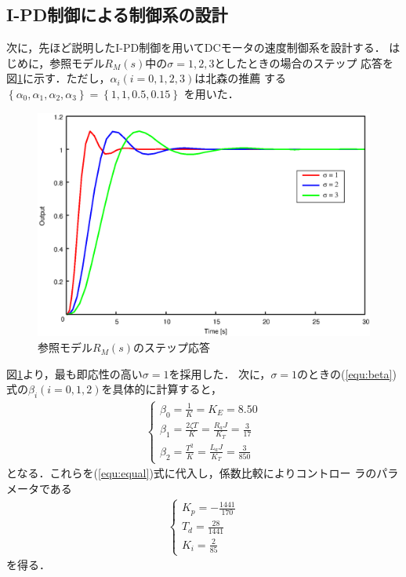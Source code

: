 \documentclass[a4paper,12pt]{jarticle}
\begin{document}
\subsection{I-PD制御による制御系の設計}
次に，先ほど説明したI-PD制御を用いてDCモータの速度制御系を設計する．
はじめに，参照モデル$R_M(s)$中の$\sigma=1,2,3$としたときの場合のステップ
応答を図\ref{fig:IPDr}に示す．ただし，$\alpha_i(i=0,1,2,3)$は北森の推薦
する
$\left\{\alpha_0,\alpha_1,\alpha_2,\alpha_3\right\}=\left\{1,1,0.5,0.15\right\}$
を用いた．
%
\begin{figure}[bp]
 \begin{center}
  \includegraphics[width = 150mm]{fig/IPDr.eps}
 \end{center}
 \caption{参照モデル$R_M(s)$のステップ応答}
 \label{fig:IPDr}
\end{figure}
%
図\ref{fig:IPDr}より，最も即応性の高い$\sigma=1$を採用した．
次に，$\sigma=1$のときの(\ref{equ:beta})式の$\beta_i(i=0,1,2)$を具体的に計算すると，
%
\begin{eqnarray}
 \begin{cases}
  \beta_0  =  \frac{1}{K} = K_E = 8.50 \\
  \beta_1  =  \frac{2\zeta T}{K} = \frac{R_a J}{K_T} = \frac{3}{17} \\
  \beta_2  =  \frac{T^2}{K} = \frac{L_a J}{K_T} = \frac{3}{850}
 \end{cases}
\end{eqnarray}
%
となる．これらを(\ref{equ:equal})式に代入し，係数比較によりコントロー
ラのパラメータである
%
\begin{eqnarray}
 \begin{cases}
  K_p = -\frac{1441}{170} \\
  T_d = \frac{28}{1441} \\
  K_i = \frac{2}{85}
 \end{cases}
\end{eqnarray}
%
を得る．
%
\end{document}
